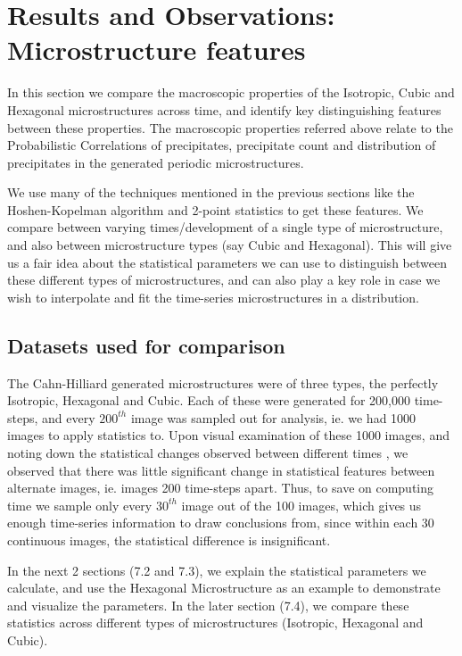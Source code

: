 \documentclass[12pt, a4paper]{report}
\begin{document}

\chapter{Results and Observations: Microstructure features}
In this section we compare the macroscopic properties of the Isotropic, Cubic and Hexagonal microstructures across time, and identify key distinguishing features between these properties. The macroscopic properties referred above relate to the Probabilistic Correlations of precipitates, precipitate count and distribution of precipitates in the generated periodic microstructures.

We use many of the techniques mentioned in the previous sections like the Hoshen-Kopelman algorithm and 2-point statistics to get these features. We compare between varying times/development of a single type of microstructure, and also between microstructure types (say Cubic and Hexagonal). This will give us a fair idea about the statistical parameters we can use to distinguish between these different types of microstructures, and can also play a key role in case we wish to interpolate and fit the time-series microstructures in a distribution.


\section{Datasets used for comparison}
The Cahn-Hilliard generated microstructures were of three types, the perfectly Isotropic, Hexagonal and Cubic. Each of these were generated for 200,000 time-steps, and every $200^{th}$ image was sampled out for analysis, ie. we had 1000 images to apply statistics to. Upon visual examination of these 1000 images, and noting down the statistical changes observed between different times , we observed that there was little significant change in statistical features between alternate images, ie. images 200 time-steps apart. Thus, to save on computing time we sample only every $30^{th}$  image out of the 100 images, which gives us enough time-series information to draw conclusions from, since within each 30 continuous images, the statistical difference is insignificant. 

In the next 2 sections (7.2 and 7.3), we explain the statistical parameters we calculate, and use the Hexagonal Microstructure as an example to demonstrate and visualize the parameters. In the later section (7.4), we compare these statistics across different types of microstructures (Isotropic, Hexagonal and Cubic).
\end{document}
